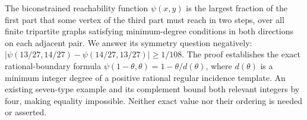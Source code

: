 The biconstrained reachability function $\psi(x,y)$ is the largest
fraction of the first part that some vertex of the third part must
reach in two steps, over all finite tripartite graphs satisfying
minimum-degree conditions in both directions on each adjacent pair.
We answer its symmetry question negatively:
$|\psi(13/27,14/27)-\psi(14/27,13/27)|\geq 1/108$.
The proof establishes the exact rational-boundary formula
$\psi(1-\theta,\theta)=1-\theta/d(\theta)$, where $d(\theta)$ is a
minimum integer degree of a positive rational regular incidence
template. An existing seven-type example and its complement bound
both relevant integers by four, making equality impossible.
Neither exact value nor their ordering is needed or asserted.
